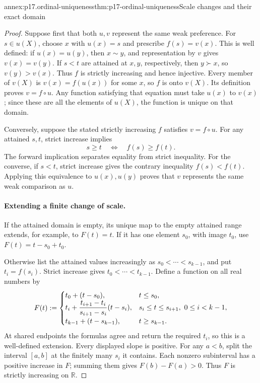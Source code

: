 \begin{annexitem}{annex:p17.ordinal-uniqueness}{thm:p17-ordinal-uniqueness}{Scale changes and their exact domain}
\begin{proof}
Suppose first that both \(u,v\) represent the same weak preference.
For \(s\in u(X)\), choose \(x\) with \(u(x)=s\) and prescribe
\(f(s)=v(x)\). This is well defined: if \(u(x)=u(y)\), then
\(x\sim y\), and representation by \(v\) gives \(v(x)=v(y)\).
If \(s<t\) are attained at \(x,y\), respectively, then \(y\succ x\),
so \(v(y)>v(x)\). Thus \(f\) is strictly increasing and hence
injective. Every member of \(v(X)\) is \(v(x)=f(u(x))\) for some
\(x\), so \(f\) is onto \(v(X)\). Its definition proves
\(v=f\circ u\). Any function satisfying that equation must take
\(u(x)\) to \(v(x)\); since these are all the elements of \(u(X)\),
the function is unique on that domain.

Conversely, suppose the stated strictly increasing \(f\) satisfies
\(v=f\circ u\). For any attained \(s,t\), strict increase implies
\[
 s\geq t\quad\Longleftrightarrow\quad f(s)\geq f(t).
\]
The forward implication separates equality from strict inequality. For
the converse, if \(s<t\), strict increase gives the contrary inequality
\(f(s)<f(t)\). Applying this equivalence to \(u(x),u(y)\) proves
that \(v\) represents the same weak comparison as \(u\).

\paragraph{Extending a finite change of scale.}
If the attained domain is empty, its unique map to the empty attained
range extends, for example, to \(F(t)=t\). If it has one element
\(s_0\), with image \(t_0\), use \(F(t)=t-s_0+t_0\).

Otherwise list the attained values increasingly as
\(s_0<\cdots<s_{k-1}\), and put \(t_i=f(s_i)\). Strict increase
gives \(t_0<\cdots<t_{k-1}\). Define a function on all real numbers by
\[
 F(t)\mathrel{:=}
 \begin{cases}
  t_0+(t-s_0),&t\leq s_0,\\
  t_i+\dfrac{t_{i+1}-t_i}{s_{i+1}-s_i}(t-s_i),
       &s_i\leq t\leq s_{i+1},\ 0\leq i<k-1,\\
  t_{k-1}+(t-s_{k-1}),&t\geq s_{k-1}.
 \end{cases}
\]
At shared endpoints the formulas agree and return the required \(t_i\),
so this is a well-defined extension. Every displayed slope is positive.
For any \(a<b\), split the interval \([a,b]\) at the finitely many
\(s_i\) it contains. Each nonzero subinterval has a positive increase
in \(F\); summing them gives \(F(b)-F(a)>0\). Thus \(F\) is
strictly increasing on \(\mathbb{R}\).


\end{proof}
\end{annexitem}
